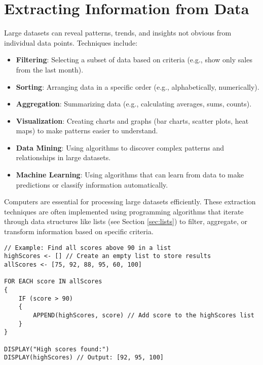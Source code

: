 \documentclass[11pt,oneside]{book}
\begin{document}
\section{Extracting Information from Data}
\label{sec:extracting_info}
Large datasets can reveal patterns, trends, and insights not obvious from individual data points. Techniques include:
\begin{itemize}
    \item \textbf{Filtering}: Selecting a subset of data based on criteria (e.g., show only sales from the last month).
    \item \textbf{Sorting}: Arranging data in a specific order (e.g., alphabetically, numerically).
    \item \textbf{Aggregation}: Summarizing data (e.g., calculating averages, sums, counts).
    \item \textbf{Visualization}: Creating charts and graphs (bar charts, scatter plots, heat maps) to make patterns easier to understand.
    \item \textbf{Data Mining}: Using algorithms to discover complex patterns and relationships in large datasets.
    \item \textbf{Machine Learning}: Using algorithms that can learn from data to make predictions or classify information automatically.
\end{itemize}
Computers are essential for processing large datasets efficiently. These extraction techniques are often implemented using programming algorithms that iterate through data structures like lists (see Section \ref{sec:lists}) to filter, aggregate, or transform information based on specific criteria.

\begin{lstlisting}[language=APCSP, label={lst:data_filtering_example}, caption={AP Pseudocode: Filtering Data in a List}]
// Example: Find all scores above 90 in a list
highScores <- [] // Create an empty list to store results
allScores <- [75, 92, 88, 95, 60, 100]

FOR EACH score IN allScores
{
    IF (score > 90)
    {
        APPEND(highScores, score) // Add score to the highScores list
    }
}

DISPLAY("High scores found:")
DISPLAY(highScores) // Output: [92, 95, 100]
\end{lstlisting}
\end{document}
